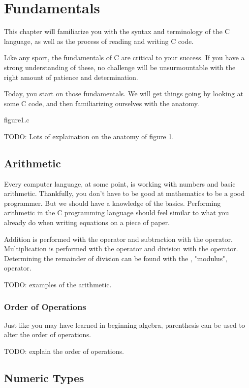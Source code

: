 \chapter{Fundamentals}

This chapter will familiarize you with the syntax and terminology of the C
language, as well as the process of reading and writing C code.

Like any sport, the fundamentals of C are critical to your success. If you have
a strong understanding of these, no challenge will be unsurmountable with the
right amount of patience and determination.

Today, you start on those fundamentals. We will get things going by looking at
some C code, and then familiarizing ourselves with the anatomy.


\begin{code}{figure1.c}

\end{code}


TODO: Lots of explaination on the anatomy of figure 1.


\section{Arithmetic}

Every computer language, at some point, is working with numbers and basic
arithmetic. Thankfully, you don't have to be good at mathematics to be a good
programmer. But we should have a knowledge of the basics. Performing arithmetic
in the C programming language should feel similar to what you already do when
writing equations on a piece of paper.

Addition is performed with the \ident{+} operator and subtraction with the
\ident{-} operator. Multiplication is performed with the \ident{*} operator and
division with the \ident{/} operator. Determining the remainder of division can
be found with the \ident{\%}, "modulus", operator.

TODO: examples of the arithmetic.

\subsection{Order of Operations}

Just like you may have learned in beginning algebra, parenthesis can be used
to alter the order of operations.

TODO: explain the order of operations.

\section{Numeric Types}

